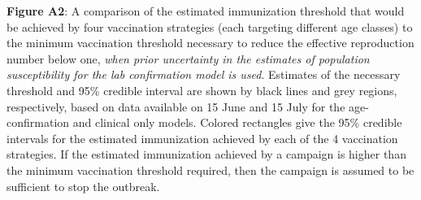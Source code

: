 \textbf{Figure A2}: A comparison of the estimated immunization threshold that would be achieved by four vaccination strategies (each targeting different age classes) to the minimum vaccination threshold necessary to reduce the effective reproduction number below one, \emph{when prior uncertainty in the estimates of population susceptibility for the lab confirmation model is used}. Estimates of the necessary threshold and 95\% credible interval are shown by black lines and grey regions, respectively, based on data available on 15 June and 15 July for the age-confirmation and clinical only models.  Colored rectangles give the 95\% credible intervals for the estimated immunization achieved by each of the 4 vaccination strategies. If the estimated immunization achieved by a campaign is higher than the minimum vaccination threshold required, then the campaign is assumed to be sufficient to stop the outbreak.
